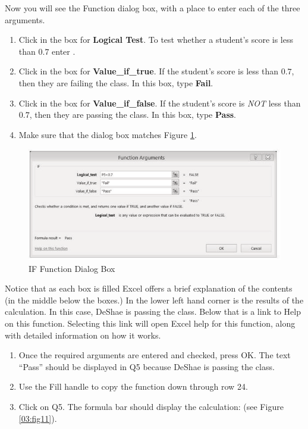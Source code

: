 Now you will see the  Function dialog box, with a place to enter each of the three arguments.

\begin{enumerate}
	\item Click in the box for \textbf{Logical Test}. To test whether a student's score is less than $ 0.7 $ enter .
	\item Click in the box for \textbf{Value\_if\_true}. If the student's score is less than $ 0.7 $, then they are failing the class. In this box, type \textbf{Fail}.
	\item Click in the box for \textbf{Value\_if\_false}. If the student's score is \textit{NOT} less than $ 0.7 $, then they are passing the class. In this box, type \textbf{Pass}.
	\item Make sure that the dialog box matches Figure \ref{03:fig10}.
\end{enumerate}

\begin{figure}[H]
	\centering
	\includegraphics[width=\maxwidth{.95\linewidth}]{gfx/ch03_fig10}
	\caption{IF Function Dialog Box}
	\label{03:fig10}
\end{figure}

Notice that as each box is filled Excel offers a brief explanation of the contents (in the middle below the boxes.) In the lower left hand corner is the results of the calculation. In this case, DeShae is passing the class. Below that is a link to Help on this function. Selecting this link will open Excel help for this function, along with detailed information on how it works.

\begin{enumerate}[resume]
	\item Once the required arguments are entered and checked, press OK. The text ``Pass'' should be displayed in \textsf{Q5} because DeShae is passing the class.
	\item Use the Fill handle to copy the  function down through row 24.
	\item Click on \textsf{Q5}. The formula bar should display the  calculation:  (see Figure \ref{03:fig11}).
\end{enumerate}

